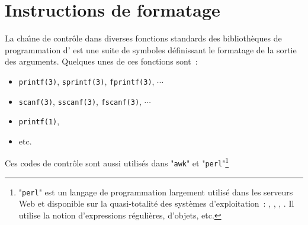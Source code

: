 %
%

\chapter{\label{ann-format}Instructions de formatage}
\thispagestyle{fancy}

La cha{\^\i}ne de contr{\^o}le dans diverses fonctions standards des
biblioth{\`e}ques de programmation d'{\Unix} est une suite de symboles
d{\'e}finissant le formatage de la sortie des arguments. Quelques unes
de ces fonctions sont~:
\begin{itemize}
	\item	{}\texttt{printf(3)}, \texttt{sprintf(3)}, \texttt{fprintf(3)}, $\cdots$
	\item	\texttt{scanf(3)}, \texttt{sscanf(3)}, \texttt{fscanf(3)}, $\cdots$
	\item	\texttt{printf(1)},
	\item	etc.
\end{itemize}

Ces codes de contr{\^o}le sont aussi utilis{\'e}s dans "\texttt{awk}" et
"\texttt{perl}"\footnote{"\texttt{perl}" est un langage de
programmation largement utilis{\'e} dans les serveurs Web et disponible
sur la quasi-totalit{\'e} des syst{\`e}mes d'exploitation~: {\Unix}, {\OpenVMS},
{\Windows}, {\MacOS}. Il utilise la notion d'expressions r{\'e}guli{\`e}res,
d'objets, etc.}

